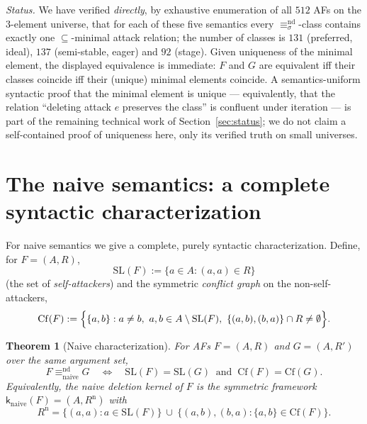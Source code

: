 \documentclass{amsart}
\newtheorem{theorem}{Theorem}
\theoremstyle{remark}
\begin{document}
\noindent\emph{Status.}  We have verified \emph{directly}, by exhaustive
enumeration of all $512$ AFs on the $3$-element universe, that for each of these
five semantics every $\equiv^{\mathrm{nd}}_\sigma$-class contains exactly one
$\subseteq$-minimal attack relation; the number of classes is $131$ (preferred,
ideal), $137$ (semi-stable, eager) and $92$ (stage).  Given uniqueness of the
minimal element, the displayed equivalence is immediate: $F$ and $G$ are
equivalent iff their classes coincide iff their (unique) minimal elements
coincide.  A semantics-uniform syntactic proof that the minimal element is
unique --- equivalently, that the relation ``deleting attack $e$ preserves the
class'' is confluent under iteration --- is part of the remaining technical work
of Section~\ref{sec:status}; we do not claim a self-contained proof of
uniqueness here, only its verified truth on small universes.

\section{The naive semantics: a complete syntactic characterization}

For naive semantics we give a complete, purely syntactic characterization.
Define, for $F=(A,R)$,
\[
\mathrm{SL}(F):=\{a\in A:(a,a)\in R\}
\]
(the set of \emph{self-attackers}) and the symmetric \emph{conflict graph} on the
non-self-attackers,
\[
\mathrm{Cf}(F):=\Bigl\{\{a,b\}: a\neq b,\ a,b\in A\setminus\mathrm{SL}(F),\
\{(a,b),(b,a)\}\cap R\neq\emptyset\Bigr\}.
\]

\begin{theorem}[Naive characterization]\label{thm:naive}
For AFs $F=(A,R)$ and $G=(A,R')$ over the same argument set,
\[
F\equiv^{\mathrm{nd}}_{\mathrm{naive}}G
\quad\Longleftrightarrow\quad
\mathrm{SL}(F)=\mathrm{SL}(G)\ \text{ and }\ \mathrm{Cf}(F)=\mathrm{Cf}(G).
\]
Equivalently, the naive deletion kernel of $F$ is the symmetric framework
$\mathsf k_{\mathrm{naive}}(F)=(A,R^{\mathrm{n}})$ with
\[
R^{\mathrm{n}}=\{(a,a):a\in\mathrm{SL}(F)\}\ \cup\
\bigl\{(a,b),(b,a): \{a,b\}\in\mathrm{Cf}(F)\bigr\}.
\]
\end{theorem}
\end{document}
